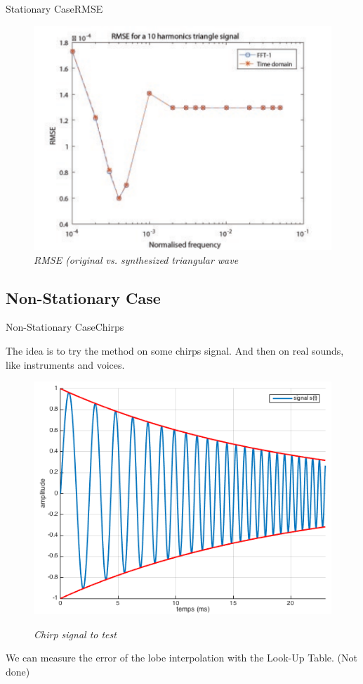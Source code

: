 \documentclass{bredelebeamer}
\begin{document}
\begin{frame}{Stationary Case}{RMSE}
\begin{figure}
      \includegraphics[scale=0.4]{rmse.pdf}
      \caption{\it RMSE (original vs. synthesized triangular wave}
\end{figure}
\end{frame}
\subsection{Non-Stationary Case}
\begin{frame}{Non-Stationary Case}{Chirps}

The idea is to try the method on some chirps signal. And then on real sounds, like instruments and voices.

\begin{figure}
{\includegraphics[scale=0.45]{chirps.png}}
	\caption{\it Chirp signal to test}
\end{figure}
We can measure the error of the lobe interpolation with the Look-Up Table. (Not done)
\end{frame}
\end{document}
